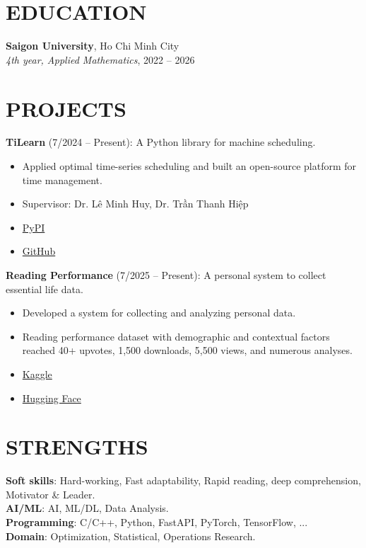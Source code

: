 \documentclass[margin]{res}
\begin{document}

\address{chibangn1@gmail.com\\+84 832 946 009\\Ho Chi Minh City}
\address{4th-year student, Applied Mathematics\\Saigon University}

\begin{resume}

\section{EDUCATION}
\textbf{Saigon University}, Ho Chi Minh City\\
{\sl 4th year, Applied Mathematics}, 2022 -- 2026

\section{PROJECTS}
\par
\textbf{TiLearn} (7/2024 -- Present): A Python library for machine scheduling.
\begin{itemize}
\item Applied optimal time-series scheduling and built an open-source platform for time management.
\item Supervisor: Dr. Lê Minh Huy, Dr. Trần Thanh Hiệp
\item \href{https://pypi.org/project/TiLearn/}{PyPI}
\item \href{https://github.com/Bancie/TiLearn}{GitHub}
\end{itemize}

\par
\textbf{Reading Performance} (7/2025 -- Present): A personal system to collect essential life data.
\begin{itemize}
\item Developed a system for collecting and analyzing personal data.
\item Reading performance dataset with demographic and contextual factors reached 40+ upvotes, 1,500 downloads, 5,500 views, and numerous analyses.
\item \href{https://www.kaggle.com/datasets/chibangng/reading-performance}{Kaggle}
\item \href{https://huggingface.co/datasets/Bancie/Reading-Dataset}{Hugging Face}
\end{itemize}

\section{STRENGTHS}
\textbf{Soft skills}: Hard-working, Fast adaptability, Rapid reading, deep comprehension, Motivator \& Leader.
\\
\textbf{AI/ML}: AI, ML/DL, Data Analysis.
\\
\textbf{Programming}: C/C++, Python, FastAPI, PyTorch, TensorFlow, ...
\\
\textbf{Domain}: Optimization, Statistical, Operations Research.


\end{resume}
\end{document}
